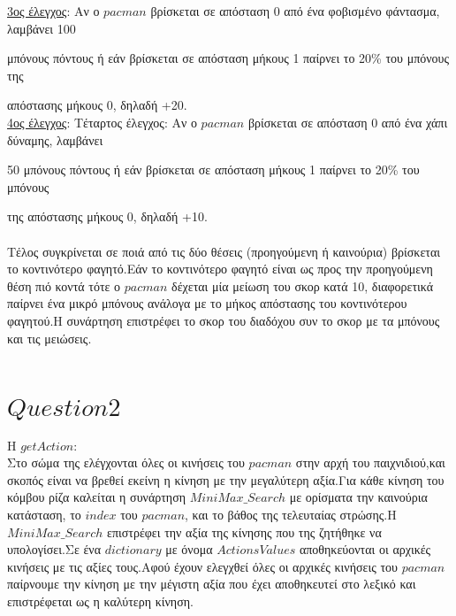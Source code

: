 \documentclass[10pt]{article}
\begin{document}
\hspace{20mm}
\underline{3ος έλεγχος}: Αν ο $pacman$ βρίσκεται σε απόσταση 0 από ένα φοβισμένο φάντασμα, λαμβάνει 100 

\hspace{41mm}
μπόνους πόντους ή εάν βρίσκεται σε απόσταση μήκους 1 παίρνει το 20\% του μπόνους της 

\hspace{41mm}
απόστασης μήκους 0, δηλαδή +20.\\

\hspace{20mm}
\underline{4ος έλεγχος}:
Τέταρτος έλεγχος: Αν ο $pacman$ βρίσκεται σε απόσταση 0 από ένα χάπι δύναμης, λαμβάνει 

\hspace{41mm}
50 μπόνους πόντους ή εάν βρίσκεται σε απόσταση μήκους 1 παίρνει το 20\% του μπόνους 

\hspace{41mm}
της απόστασης μήκους 0,  δηλαδή +10. \\ \\
Τέλος συγκρίνεται σε ποιά από τις δύο θέσεις (προηγούμενη ή καινούρια) βρίσκεται το κοντινότερο φαγητό.Εάν το κοντινότερο φαγητό είναι ως προς την προηγούμενη θέση πιό κοντά τότε ο $pacman$ δέχεται μία μείωση του σκορ κατά 10, διαφορετικά παίρνει ένα μικρό μπόνους ανάλογα με το μήκος απόστασης του κοντινότερου φαγητού.Η συνάρτηση επιστρέφει το σκορ του διαδόχου συν το σκορ με τα μπόνους και τις μειώσεις. \\ \\
\section*{$Question 2$}
\vspace{5mm}
\hspace{10mm}
H \underline{$getAction$}: \\

Στο σώμα της ελέγχονται όλες οι κινήσεις του $pacman$ στην αρχή του παιχνιδιού,και σκοπός είναι να βρεθεί εκείνη η κίνηση  με την μεγαλύτερη αξία.Για κάθε κίνηση του κόμβου ρίζα καλείται η συνάρτηση $MiniMax\_Search$ με ορίσματα την καινούρια κατάσταση, το $index$ του $pacman$, και το βάθος της τελευταίας στρώσης.Η $MiniMax\_Search$ επιστρέφει την αξία της κίνησης που της ζητήθηκε να υπολογίσει.Σε ένα $dictionary$ με όνομα $ActionsValues$ αποθηκεύονται οι αρχικές κινήσεις με τις αξίες τους.Αφού έχουν ελεγχθεί όλες οι αρχικές κινήσεις του $pacman$ παίρνουμε την κίνηση με την μέγιστη αξία που έχει αποθηκευτεί στο λεξικό και επιστρέφεται ως η καλύτερη κίνηση.\\ \\
\end{document}

